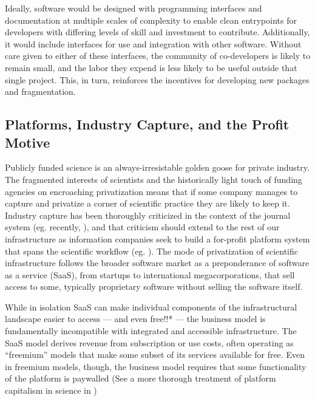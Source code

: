 \documentclass[10pt]{tufte-book}
\begin{document}
Ideally, software would be designed with programming interfaces and
documentation at multiple scales of complexity to enable clean
entrypoints for developers with differing levels of skill and investment
to contribute. Additionally, it would include interfaces for use and
integration with other software. Without care given to either of these
interfaces, the community of co-developers is likely to remain small,
and the labor they expend is less likely to be useful outside that
single project. This, in turn, reinforces the incentives for developing
new packages and fragmentation.


\subsection{Platforms, Industry Capture, and the Profit
Motive}

Publicly funded science is an always-irresistable golden goose for
private industry. The fragmented interests of scientists and the
historically light touch of funding agencies on encroaching
privatization means that if some company manages to capture and
privatize a corner of scientific practice they are likely to keep it.
Industry capture has been thoroughly criticized in the context of the
journal system (eg. recently, \citep{brembsReplacingAcademicJournals2021} ), and that criticism should
extend to the rest of our infrastructure as information companies seek
to build a for-profit platform system that spans the scientific workflow
(eg. \citep{ElsevierSevenBridges2017} ). The mode of privatization
of scientific infrastructure follows the broader software market as a
preponderance of software as a service (SaaS), from startups to
international megacorporations, that sell access to some, typically
proprietary software without selling the software itself.

While in isolation SaaS can make individual components of the
infrastructural landscape easier to access --- and even free!!* --- the
business model is fundamentally incompatible with integrated and
accessible infrastructure. The SaaS model derives revenue from
subscription or use costs, often operating as ``freemium'' models that
make some subset of its services available for free. Even in freemium
models, though, the business model requires that some functionality of
the platform is paywalled (See a more thorough treatment of platform
capitalism in science in \citep{mirowskiFutureOpenScience2018} )
\end{document}
